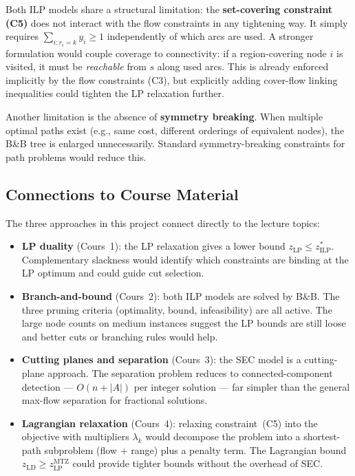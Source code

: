 \documentclass[12pt, a4paper]{article}
\begin{document}
Both ILP models share a structural limitation: the \textbf{set-covering constraint
(C5)} does not interact with the flow constraints in any tightening way. It simply
requires $\sum_{i: r_i = k} y_i \geq 1$ independently of which arcs are used.
A stronger formulation would couple coverage to connectivity: if a region-covering
node $i$ is visited, it must be \emph{reachable} from $s$ along used arcs. This is
already enforced implicitly by the flow constraints (C3), but explicitly adding
cover-flow linking inequalities could tighten the LP relaxation further.

Another limitation is the absence of \textbf{symmetry breaking}. When multiple
optimal paths exist (e.g., same cost, different orderings of equivalent nodes), the
B\&B tree is enlarged unnecessarily. Standard symmetry-breaking constraints for
path problems would reduce this.

\subsection{Connections to Course Material}

The three approaches in this project connect directly to the lecture topics:
\begin{itemize}[nosep]
  \item \textbf{LP duality} (Cours~1): the LP relaxation gives a lower bound
        $z_{\mathrm{LP}} \leq z_{\mathrm{ILP}}^*$. Complementary slackness would
        identify which constraints are binding at the LP optimum and could guide
        cut selection.
  \item \textbf{Branch-and-bound} (Cours~2): both ILP models are solved by B\&B.
        The three pruning criteria (optimality, bound, infeasibility) are all active.
        The large node counts on medium instances suggest the LP bounds are still
        loose and better cuts or branching rules would help.
  \item \textbf{Cutting planes and separation} (Cours~3): the SEC model is a
        cutting-plane approach. The separation problem reduces to connected-component
        detection --- $O(n + |A|)$ per integer solution --- far simpler than the
        general max-flow separation for fractional solutions.
  \item \textbf{Lagrangian relaxation} (Cours~4): relaxing constraint~(C5) into the
        objective with multipliers $\lambda_k$ would decompose the problem into a
        shortest-path subproblem (flow + range) plus a penalty term. The Lagrangian
        bound $z_{\mathrm{LD}} \geq z_{\mathrm{LP}}^{\mathrm{MTZ}}$ could provide
        tighter bounds without the overhead of SEC.
\end{itemize}
\end{document}
